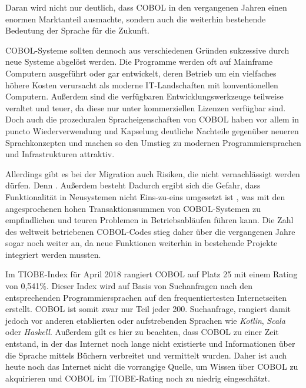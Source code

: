 Daran wird nicht nur deutlich, dass COBOL in den vergangenen Jahren einen enormen Marktanteil ausmachte, sondern auch die weiterhin bestehende Bedeutung der Sprache für die Zukunft.

COBOL-Systeme sollten dennoch aus verschiedenen Gründen sukzessive durch neue Systeme abgelöst werden. Die Programme werden oft auf Mainframe Computern ausgeführt oder gar entwickelt, deren Betrieb um ein vielfaches höhere Kosten verursacht als moderne IT-Landschaften mit konventionellen Computern. Außerdem sind die verfügbaren Entwicklungswerkzeuge teilweise veraltet und teuer, da diese nur unter kommerziellen Lizenzen verfügbar sind. Doch auch die prozeduralen Spracheigenschaften von COBOL haben vor allem in puncto Wiederverwendung und Kapselung deutliche Nachteile gegenüber neueren Sprachkonzepten und machen so den Umstieg zu modernen Programmiersprachen und Infrastrukturen attraktiv.

Allerdings gibt es bei der Migration auch Risiken, die nicht vernachlässigt werden dürfen. Denn  \cite{beat_balzli_cobol-programmierer_2017}. 
Außerdem besteht  \cite{sneed_softwaremigration_2010}
Dadurch ergibt sich die Gefahr, dass Funktionalität in Neusystemen nicht Eins-zu-eins umgesetzt ist \cite{sneed_softwaremigration_2010}, was mit den angesprochenen hohen Transaktionssummen von COBOL-Systemen zu empfindlichen und teuren Problemen in Betriebsabläufen führen kann. Die Zahl des weltweit betriebenen COBOL-Codes stieg daher über die vergangenen Jahre sogar noch weiter an, da neue Funktionen weiterhin in bestehende Projekte integriert werden mussten.


Im TIOBE-Index \cite{_tiobe_} für April 2018 rangiert COBOL auf Platz 25 mit einem Rating von 0,541\%. Dieser Index wird auf Basis von Suchanfragen nach den entsprechenden Programmiersprachen auf den frequentiertesten Internetseiten erstellt. COBOL ist somit zwar nur Teil jeder 200. Suchanfrage, rangiert damit jedoch vor anderen etablierten oder aufstrebenden Sprachen wie \textit{Kotlin}, \textit{Scala} oder \textit{Haskell}. Außerdem gilt es hier zu beachten, dass COBOL zu einer Zeit entstand, in der das Internet noch lange nicht existierte und Informationen über die Sprache mittels Büchern verbreitet und vermittelt wurden. Daher ist auch heute noch das Internet nicht die vorrangige Quelle, um Wissen über COBOL zu akquirieren und COBOL im TIOBE-Rating noch zu niedrig eingeschätzt.



